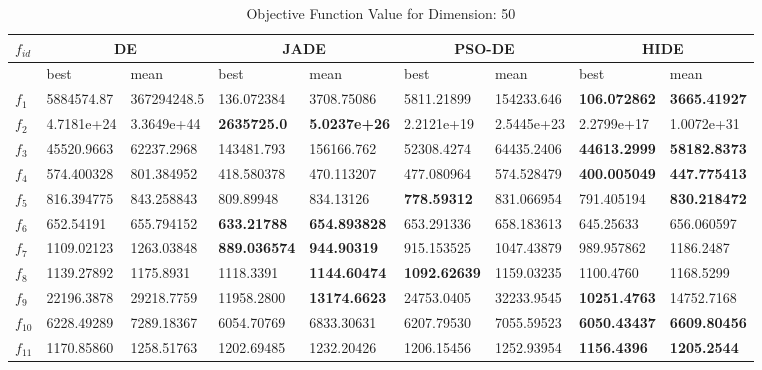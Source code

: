 \begin{table*}[t!]
\centering
\caption{Objective Function Value for Dimension: 50}
 \begin{tabular}{|p{0.8cm}|p{1.6cm}|p{1.6cm}|p{1.6cm}|p{1.6cm}|p{1.6cm}|p{1.6cm}|p{1.6cm}|p{1.6cm}|} 
 \hline
$f_{id}$ & \multicolumn{2}{c|}{DE} & \multicolumn{2}{c|}{JADE} & \multicolumn{2}{c|}{PSO-DE} & \multicolumn{2}{c|}{HIDE} \\
 \hline
    & best & mean & best & mean & best & mean & best & mean \\ [0.5ex] 
 \hline
$f_{1}$  & 5884574.87 & 367294248.5 & 136.072384 & 3708.75086 & 5811.21899 & 154233.646 & \textbf{106.072862} & \textbf{3665.41927} \\ 
$f_{2}$  & 4.7181e+24 & 3.3649e+44 & \textbf{2635725.0} & \textbf{5.0237e+26} & 2.2121e+19 & 2.5445e+23 & 2.2799e+17 & 1.0072e+31 \\ 
$f_{3}$  & 45520.9663 & 62237.2968 & 143481.793 & 156166.762 & 52308.4274 & 64435.2406 & \textbf{44613.2999} & \textbf{58182.8373} \\
$f_{4}$  & 574.400328 & 801.384952 & 418.580378 & 470.113207 & 477.080964 & 574.528479 & \textbf{400.005049} & \textbf{447.775413} \\ 
$f_{5}$  & 816.394775 & 843.258843 & 809.89948 & 834.13126 & \textbf{778.59312} & 831.066954 & 791.405194 & \textbf{830.218472} \\ 
$f_{6}$  & 652.54191 & 655.794152 & \textbf{633.21788} & \textbf{654.893828} & 653.291336 & 658.183613 & 645.25633 & 656.060597 \\ 
$f_{7}$  & 1109.02123 & 1263.03848 & \textbf{889.036574} & \textbf{944.90319} & 915.153525 & 1047.43879 & 989.957862 & 1186.2487 \\ 
$f_{8}$  & 1139.27892 & 1175.8931 & 1118.3391 & \textbf{1144.60474} & \textbf{1092.62639} & 1159.03235 & 1100.4760 & 1168.5299 \\ 
$f_{9}$  & 22196.3878 & 29218.7759 & 11958.2800 & \textbf{13174.6623} & 24753.0405 & 32233.9545 & \textbf{10251.4763} & 14752.7168 \\ 
$f_{10}$  & 6228.49289 & 7289.18367 & 6054.70769 & 6833.30631 & 6207.79530 & 7055.59523 & \textbf{6050.43437} & \textbf{6609.80456} \\ 
$f_{11}$  & 1170.85860 & 1258.51763 & 1202.69485 & 1232.20426 & 1206.15456 & 1252.93954 & \textbf{1156.4396} & \textbf{1205.2544} \\ 

\end{tabular}
\end{table*}
